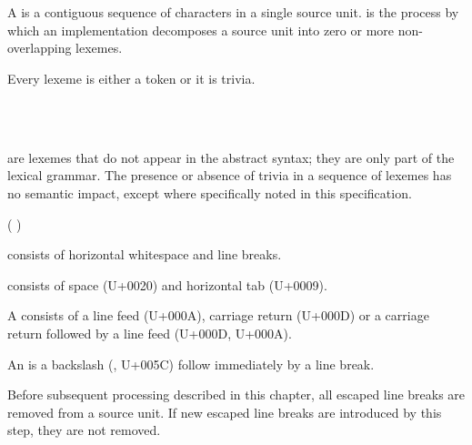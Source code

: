 
\begin{Lexical}
     \\
         \\
    \SynOr {}
\end{Lexical}

A  is a contiguous sequence of characters in a single source unit.
 is the process by which an implementation decomposes a source unit into zero or more non-overlapping lexemes.

Every lexeme is either a token or it is trivia.


\begin{Lexical}
     \\
         \\
    \SynOr {}
\end{Lexical}

 are lexemes that do not appear in the abstract syntax; they are only part of the lexical grammar.
The presence or absence of trivia in a sequence of lexemes has no semantic impact, except where specifically noted in this specification.


\begin{Lexical}
    \SynOr {}

        (  \SynOr {} )\SynStar
\end{Lexical}

 consists of horizontal whitespace and line breaks.

 consists of space (U+0020) and horizontal tab (U+0009).


A  consists of a line feed (U+000A), carriage return (U+000D) or a carriage return followed by a line feed (U+000D, U+000A).

\begin{Legacy}
 An  is a backslash (\Char{\\}, U+005C) follow immediately by a line break.

 Before subsequent processing described in this chapter, all escaped line breaks are removed from a source unit.
 If new escaped line breaks are introduced by this step, they are not removed.
\end{Legacy}


